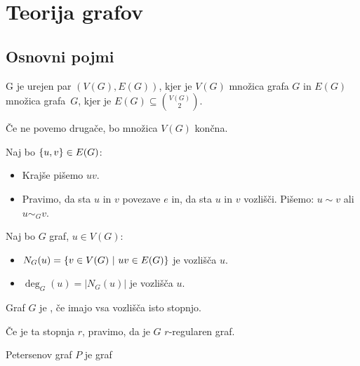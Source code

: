 \section{Teorija grafov}
\subsection{Osnovni pojmi}
\begin{definicija}
     G je urejen par $(V(G), E(G))$, kjer je $V(G)$ množica  grafa $G$ in $E(G)$ množica  grafa~$G$, kjer je $E(G) \subseteq \binom{V(G)}{2}$.
\end{definicija}

\begin{opomba}
    Če ne povemo drugače, bo množica $V(G)$ končna.
\end{opomba}

\begin{opomba}
    Naj bo $\left\{u, v\right\} \in E(G)$:
    \begin{itemize}
        \item Krajše pišemo $uv$.
        \item Pravimo, da sta $u$ in $v$  povezave $e$ in, da sta $u$ in $v$  vozlišči.        
        Pišemo: $u \sim v$ ali $u \sim_G v$.
    \end{itemize}
\end{opomba}

\begin{definicija}
    Naj bo $G$ graf, $u \in V(G)$:
    \begin{itemize}
        \item $N_G(u) = \left\{v \in V(G) \ | \ uv \in E(G)\right\}$ je  vozlišča $u$.
        \item $\deg_G(u) = |N_G(u)|$ je  vozlišča $u$.
    \end{itemize}
\end{definicija}

\begin{definicija}
    Graf $G$ je , če imajo vsa vozlišča isto stopnjo.
\end{definicija}

\begin{opomba}
    Če je ta stopnja $r$, pravimo, da je $G$ $r$-regularen graf.
\end{opomba}

\begin{primer}
    Petersenov graf $P$ je graf
\end{primer}

